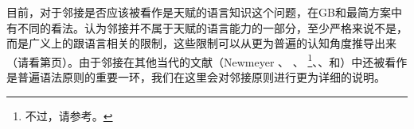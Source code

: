 

目前，对于邻接是否应该被看作是天赋的语言知识这个问题，在GB和最简方案中有不同的看法。\citet*{HCF2002a}认为邻接并不属于天赋的语言能力的一部分，至少严格来说不是，而是广义上的跟语言相关的限制，这些限制可以从更为普遍的认知角度推导出来（请看第\pageref{Seite-Subjazenz-Performanz}页）。由于邻接在其他当代的文献（Newmeyer \citeyear[, 74--75]{Newmeyer2005a}、
\citeyear[]{Newmeyer2004b}、
\citealp{Baltin2006a}\footnote{
不过，请参考。
}、\citealp{Baker2009a}、\citealp{Freidin2009a}和\citealp{Rizzi2009a,Rizzi2009b}）中还被看作是普遍语法原则的重要一环，我们在这里会对邻接原则进行更为详细的说明。

